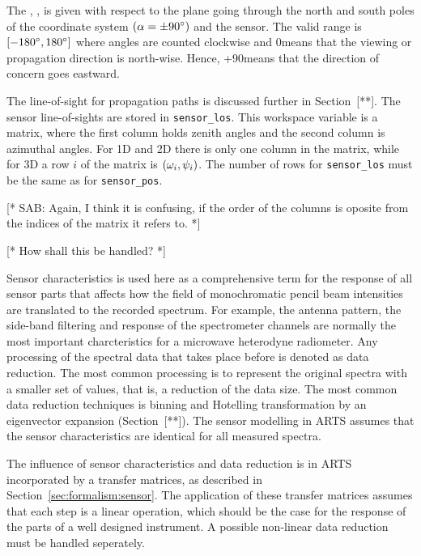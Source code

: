 The , \AzmAng, is given with respect to the
plane going through the north and south poles of the coordinate system
$(\alpha=\pm90^\circ)$ and the sensor. The valid range is
$[-180^\circ,180^\circ]$ where angles are counted clockwise and
0\degree means that the viewing or propagation direction is north-wise.
Hence, +90\degree means that the direction of concern goes eastward.

The line-of-sight for propagation paths is discussed further in
Section~[**]. The sensor line-of-sights are stored in
\verb|sensor_los|. This workspace variable is a matrix, where the
first column holds zenith angles and the second column is azimuthal
angles. For 1D and 2D there is only one column in the matrix, while
for 3D a row $i$ of the matrix is $(\omega_{i},\psi_{i})$. The
number of rows for \verb|sensor_los| must be the same as for
\verb|sensor_pos|.

[* SAB: Again, I think it is confusing, if the order of the columns is
oposite from the indices of the matrix it refers to. *]

\label{sec:fm_defs:sensorpol}

[* How shall this be handled? *]


\label{sec:fm_defs:sensorchar}

Sensor characteristics is used here as a comprehensive term for the
response of all sensor parts that affects how the field of
monochromatic pencil beam intensities are translated to the recorded
spectrum. For example, the antenna pattern, the side-band filtering
and response of the spectrometer channels are normally the most
important charcteristics for a microwave heterodyne radiometer. Any
processing of the spectral data that takes place before is denoted as
data reduction. The most common processing is to represent the
original spectra with a smaller set of values, that is, a reduction of
the data size. The most common data reduction techniques is binning
and Hotelling transformation by an eigenvector expansion
(Section~[**]). The sensor modelling in ARTS assumes that the sensor
characteristics are identical for all measured spectra.

The influence of sensor characteristics and data reduction is in ARTS
incorporated by a transfer matrices, as described in
Section~\ref{sec:formalism:sensor}. The application of these transfer
matrices assumes that each step is a linear operation, which should be
the case for the response of the parts of a well designed instrument.
A possible non-linear data reduction must be handled seperately.

